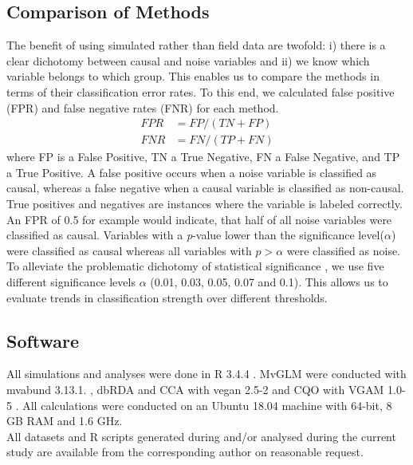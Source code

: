 \documentclass[a4paper,11pt]{article}
\begin{document}
	\subsection*{Comparison of Methods}
        The benefit of using simulated rather than field data are twofold:
        i) there is a clear dichotomy between causal and noise variables and 
        ii) we know which variable belongs to which group. 
        This enables us to compare the methods in terms of their classification error rates.
        To this end, we calculated false positive (FPR) and false negative rates (FNR) for each method.
        \begin{align}
          FPR &= FP /(TN + FP) \\        
          FNR &=  FN / (TP + FN)
        \end{align}
        where FP is a False Positive, TN a True Negative, FN a False Negative, and TP a True Positive. 
        A false positive occurs when a noise variable is classified as causal, whereas a false negative when a causal variable is classified as non-causal. 
        True positives and negatives are instances where the variable is labeled correctly. 
        An FPR of 0.5 for example would indicate, that half of all noise variables were classified as causal. 
        Variables with a \textit{p}-value lower than the significance level($\alpha$) were classified as causal whereas all variables with $p > \alpha $  were classified as noise.
        To alleviate the problematic dichotomy of statistical significance \citep{Greenland2016}, we use five different significance levels $\alpha$ (0.01, 0.03, 0.05, 0.07 and 0.1).
		This allows us to evaluate trends in classification strength over different thresholds. 
        

	\subsection*{Software}
		All simulations and analyses were done in R 3.4.4 \citep{RCT2018}.
		MvGLM were conducted with mvabund 3.13.1. \citep{Wang2019}, dbRDA and CCA with vegan 2.5-2 \citep{Oksanen2018} and CQO with VGAM 1.0-5 \citep{VGAM19}. 
		All calculations were conducted on an Ubuntu 18.04 machine with 64-bit, 8 GB RAM and 1.6 GHz.\\
		All datasets and R scripts generated during and/or analysed during the current study are available from the corresponding author on reasonable request.
\end{document}
